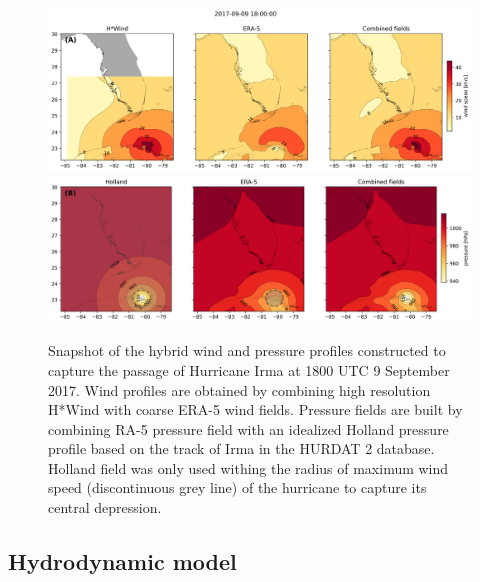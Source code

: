 \documentclass[preprint,12pt,authoryear]{elsarticle}
\begin{document}
\begin{figure}
    \centering
    \includegraphics[width=.99\textwidth]{fig/hwind_vs_era.png}
    \includegraphics[width=.99\textwidth]{fig/holland_vs_era.png}
    \caption{Snapshot of the hybrid wind and pressure profiles constructed to capture the passage of Hurricane Irma at 1800 UTC 9 September 2017. Wind profiles are obtained by combining high resolution H*Wind with coarse ERA-5 wind fields. Pressure fields are built by combining RA-5 pressure field with an idealized Holland pressure profile based on the track of Irma in the HURDAT 2 database. Holland field was only used withing the radius of maximum wind speed (discontinuous grey line) of the hurricane to capture its central depression. }
    \label{fig:atm}
\end{figure}

\subsection{Hydrodynamic model}
\end{document}
